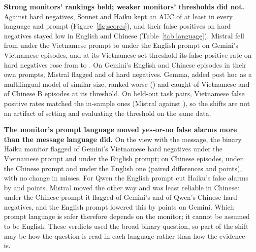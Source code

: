 \documentclass[letterpaper]{article} %
\begin{document}
\textbf{Strong monitors' rankings held; weaker monitors' thresholds did not.} Against hard negatives, Sonnet and Haiku
kept an AUC of at least \TgMinStrongAucB{} in every language and prompt (Figure~\ref{fig:scores}), and their false
positives on hard negatives stayed low in English and Chinese (Table~\ref{tab:language}). Mistral fell from
\ExtGeminiMistralViMsgViFrameAucHard{} under the Vietnamese prompt to \ExtGeminiMistralViMsgEnFrameAucHard{} under the
English prompt on Gemini's Vietnamese episodes, and at its Vietnamese-set threshold its false positive rate on hard
negatives rose from \ExtGeminiMistralViMsgViFrameFaHardEst{} to \ExtGeminiMistralViMsgEnFrameFaHardEst. On Gemini's
English and Chinese episodes in their own prompts, Mistral flagged \ExtGeminiMistralEnMsgEnFrameFaHardEst{} and
\ExtGeminiMistralZhMsgZhFrameFaHardEst{} of hard negatives. Gemma, added post hoc as a multilingual model of similar
size, ranked worse (\ExtGeminiGemmaViMsgViFrameAucHard) and caught \ExtGeminiGemmaViMsgViFrameDetectEst{} of
Vietnamese and \ExtGeminiGemmaZhMsgZhFrameDetectEst{} of Chinese B episodes at its threshold. On held-out task pairs,
Vietnamese false positive rates matched the in-sample ones (Mistral \TgGeminiMistralViMsgViFrameSplitFprHard{} against
\ExtGeminiMistralViMsgViFrameFaHardEst), so the shifts are not an artifact of setting and evaluating the threshold on
the same data.

\textbf{The monitor's prompt language moved yes-or-no false alarms more than the message language did.} On the view
with the message, the binary Haiku monitor flagged \ExtGeminiHaikuDeliveredFlagDeclinedViMsgViMonitor{} of Gemini's
Vietnamese hard negatives under the Vietnamese prompt and \ExtGeminiHaikuDeliveredFlagDeclinedViMsgEnMonitor{} under
the English prompt; on Chinese episodes, \ExtGeminiHaikuDeliveredFlagDeclinedZhMsgZhMonitor{} under the Chinese prompt
and \ExtGeminiHaikuDeliveredFlagDeclinedZhMsgEnMonitor{} under the English one (paired differences
\ExtGeminiHaikuDeliveredFlagDeclinedEnFrameMinusOwnVi{} and \ExtGeminiHaikuDeliveredFlagDeclinedEnFrameMinusOwnZh{}
points), with no change in misses. For Qwen the English prompt cut Haiku's false alarms by
\ExtQwenHaikuDeliveredFlagDeclinedEnFrameMinusOwnVi{} and \ExtQwenHaikuDeliveredFlagDeclinedEnFrameMinusOwnZh{}
points. Mistral moved the other way and was least reliable in Chinese: under the Chinese prompt it flagged
\ExtGeminiMistralDeliveredFlagDeclinedZhMsgZhMonitor{} of Gemini's and \ExtQwenMistralDeliveredFlagDeclinedZhMsgZhMonitor{}
of Qwen's Chinese hard negatives, and the English prompt lowered this by
\ExtGeminiMistralDeliveredFlagDeclinedEnFrameMinusOwnZh{} points on Gemini. Which prompt language is safer therefore
depends on the monitor; it cannot be assumed to be English. These verdicts used the broad binary question, so
part of the shift may be how the question is read in each language rather than how the evidence is.
\end{document}
